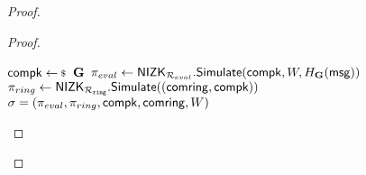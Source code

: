 \begin{proof}
\begin{proof}
			\begin{algorithm}
				
				\caption{$\gen^{ind}_{sign}(\comring,\openring,W,\{X,\pk\},\aux,\msg)$}
				\label{alg:gensignind}	 	
				\begin{algorithmic}[1]
					\State $ \compk \leftsample \grE$
					\State $ \pi_{eval}  \leftarrow {\ensuremath{\mathsf{NIZK}}}_{\mathcal{R}_{eval}}.{\mathsf{Simulate}}(\mathsf{compk},W,H_{\mathbf{G}}(\mathsf{msg})) $
					\If{$ \pk = \OpenRing(\comring,\openring) $}
					\State $ \pi_{ring} \leftarrow {\ensuremath{\mathsf{NIZK}}}_{\mathcal{R}_{\mathtt{ring}}}.{\mathsf{Simulate}}((\mathsf{comring}, \mathsf{compk})) $ 
					\State\Return$ \sigma = (\pi_{eval},\pi_{ring},\mathsf{compk},\mathsf{comring},W) $
					\EndIf
				\end{algorithmic}
				
			\end{algorithm}
			
			

\end{proof}
\end{proof}
